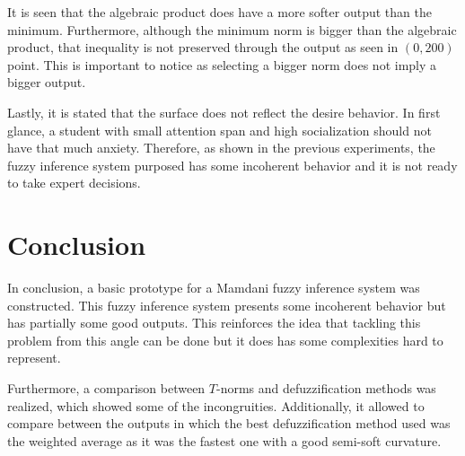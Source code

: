 \documentclass[conference]{IEEEtran}
\theoremstyle{definition}
\theoremstyle{remark}
\theoremstyle{remark}
\begin{document}
It is seen that the algebraic product does have a more softer output than the
minimum. Furthermore, although the minimum norm is bigger than the algebraic
product, that inequality is not preserved through the output as seen in
$(0, 200)$ point. This is important to notice as selecting a bigger norm does
not imply a bigger output.

Lastly, it is stated that the surface does not reflect the desire behavior. In
first glance, a student with small attention span and high socialization should
not have that much anxiety. Therefore, as shown in the previous experiments, the
fuzzy inference system purposed has some incoherent behavior and it is not ready
to take expert decisions.

\section{Conclusion}
In conclusion, a basic prototype for a Mamdani fuzzy inference system was
constructed. This fuzzy inference system presents some incoherent behavior but
has partially some good outputs. This reinforces the idea that tackling this
problem from this angle can be done but it does has some complexities hard to
represent.

Furthermore, a comparison between $T$-norms and defuzzification methods was
realized, which showed some of the incongruities. Additionally, it allowed to
compare between the outputs in which the best defuzzification method used was
the weighted average as it was the fastest one with a good semi-soft curvature.

\printbibliography
\end{document}
